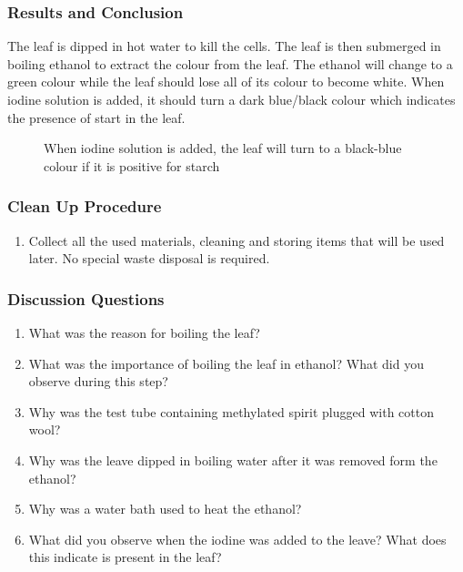 \subsubsection*{Results and Conclusion}
The leaf is dipped in hot water to kill the cells. The leaf is then submerged in boiling ethanol to extract the colour from the leaf. The ethanol will change to a green colour while the leaf should lose all of its colour to become white. When iodine solution is added, it should turn a dark blue/black colour which indicates the presence of start in the leaf.

\begin{figure}[h]
\begin{center}
\def\svgwidth{6cm}

\caption{When iodine solution is added, the leaf will turn to a black-blue colour if it is positive for starch}
\label{fig:starch}
\end{center}
\end{figure}

\subsubsection*{Clean Up Procedure}
\begin{enumerate}
\item{Collect all the used materials, cleaning and storing items that will be used later. No special waste disposal is required.}
\end{enumerate}

\subsubsection*{Discussion Questions}
\begin{enumerate}
\item{What was the reason for boiling the leaf?}
\item{What was the importance of boiling the leaf in ethanol? What did you observe during this step?}
\item{Why was the test tube containing methylated spirit plugged with cotton wool?}
\item{Why was the leave dipped in boiling water after it was removed form the ethanol?}
\item{Why was a water bath used to heat the ethanol?}
\item{What did you observe when the iodine was added to the leave? What does this indicate is present in the leaf?}
\end{enumerate}

